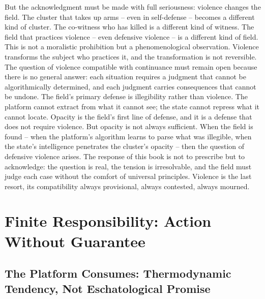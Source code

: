 But the acknowledgment must be made with full seriousness: violence changes the field. The cluster that takes up arms – even in self-defense – becomes a different kind of cluster. The co-witness who has killed is a different kind of witness. The field that practices violence – even defensive violence – is a different kind of field. This is not a moralistic prohibition but a phenomenological observation. Violence transforms the subject who practices it, and the transformation is not reversible. The question of violence compatible with continuance must remain open because there is no general answer: each situation requires a judgment that cannot be algorithmically determined, and each judgment carries consequences that cannot be undone. The field’s primary defense is illegibility rather than violence. The platform cannot extract from what it cannot see; the state cannot repress what it cannot locate. Opacity is the field’s first line of defense, and it is a defense that does not require violence. But opacity is not always sufficient. When the field is found – when the platform’s algorithm learns to parse what was illegible, when the state’s intelligence penetrates the cluster’s opacity – then the question of defensive violence arises. The response of this book is not to prescribe but to acknowledge: the question is real, the tension is irresolvable, and the field must judge each case without the comfort of universal principles. Violence is the last resort, its compatibility always provisional, always contested, always mourned.

\section{Finite Responsibility: Action Without Guarantee}

\subsection{The Platform Consumes: Thermodynamic Tendency, Not Eschatological Promise}

